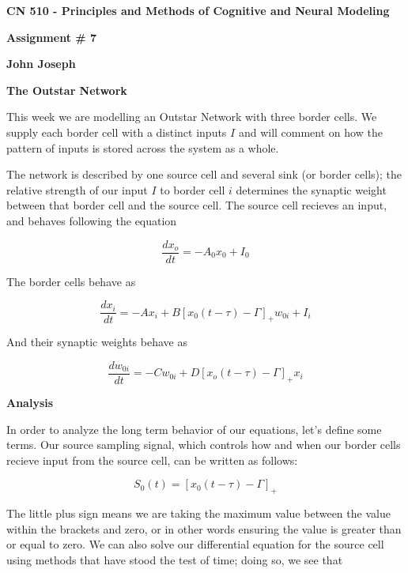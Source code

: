 \documentclass[a4paper,12pt]{article}
\begin{document}
\begin{center}

{\Large\bf CN 510 - Principles and Methods of Cognitive and Neural Modeling}

\bigskip

{\large\bf Assignment \# 7}
\smallskip

{\large\bf John Joseph}
\end{center}

\bigskip
{\bf The Outstar Network}
\bigskip

This week we are modelling an Outstar Network with three border cells. We supply each border cell with a distinct inputs $I$ and will comment on how the pattern of inputs is stored across the system as a whole. 

\vspace{2mm}

The network is described by one source cell and several sink (or border cells); the relative strength of our input $I$ to border cell $i$ determines the synaptic weight between that border cell and the source cell. The source cell recieves an input, and behaves following the equation

\begin{equation}
  \frac{dx_o}{dt} = -A_0x_0+I_0
\end{equation}

The border cells behave as

\begin{equation}
  \frac{dx_i}{dt} = -Ax_i+B[x_0(t-\tau) - \Gamma]_+w_{0i} + I_i
\end{equation}

And their synaptic weights behave as

\begin{equation}
  \frac{dw_{0i}}{dt} = -Cw_{0i}+D[x_o(t-\tau)-\Gamma]_+x_i
\end{equation}

\bigskip
{\bf Analysis}
\bigskip

In order to analyze the long term behavior of our equations, let's define some terms. Our source sampling signal, which controls how and when our border cells recieve input from the source cell, can be written as follows:

\begin{equation}
  S_0(t) = [x_0(t-\tau)-\Gamma]_+
\end{equation}

The little plus sign means we are taking the maximum value between the value within the brackets and zero, or in other words ensuring the value is greater than or equal to zero. We can also solve our differential equation for the source cell using methods that have stood the test of time; doing so, we see that
\end{document}
